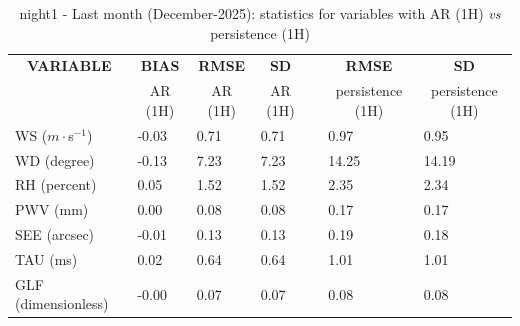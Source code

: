 \begin{table}[]
\begin{center}
\begin{tabular}{|l|l|l|l|l|l|l|}
\hline
\multicolumn{1}{|c|}{\cellcolor[HTML]{C0C0C0}\textbf{VARIABLE}} & \multicolumn{1}{c|}{\cellcolor[HTML]{C0C0C0}\textbf{BIAS}} & \multicolumn{1}{c|}{\cellcolor[HTML]{C0C0C0}\textbf{RMSE}} & \multicolumn{1}{c|}{\cellcolor[HTML]{C0C0C0}\textbf{SD}} & & \multicolumn{1}{c|}{\cellcolor[HTML]{C0C0C0}\textbf{RMSE}} & \multicolumn{1}{c|}{\cellcolor[HTML]{C0C0C0}\textbf{SD}}\\
\multicolumn{1}{|c|}{\cellcolor[HTML]{C0C0C0}} & \multicolumn{1}{c|}{\cellcolor[HTML]{C0C0C0}AR (1H)} & \multicolumn{1}{c|}{\cellcolor[HTML]{C0C0C0}AR (1H)} & \multicolumn{1}{c|}{\cellcolor[HTML]{C0C0C0}AR (1H)} & & \multicolumn{1}{c|}{\cellcolor[HTML]{C0C0C0}persistence (1H)} & \multicolumn{1}{c|}{\cellcolor[HTML]{C0C0C0}persistence (1H)}\\\hline
\cellcolor[HTML]{C0C0C0}WS ($m\cdot$s$^{-1}$) &     -0.03  &      0.71  &      0.71  & &      0.97  &      0.95\\
\cellcolor[HTML]{C0C0C0}WD (degree)           &     -0.13  &      7.23  &      7.23  & &     14.25  &     14.19\\
\cellcolor[HTML]{C0C0C0}RH (percent)          &      0.05  &      1.52  &      1.52  & &      2.35  &      2.34\\
\cellcolor[HTML]{C0C0C0}PWV (mm)              &      0.00 &      0.08 &      0.08 & &      0.17 &      0.17\\
\cellcolor[HTML]{C0C0C0}SEE (arcsec)          &     -0.01 &      0.13 &      0.13 & &      0.19 &      0.18\\
\cellcolor[HTML]{C0C0C0}TAU (ms)              &      0.02 &      0.64 &      0.64 & &      1.01 &      1.01\\
\cellcolor[HTML]{C0C0C0}GLF (dimensionless)   &     -0.00 &      0.07 &      0.07 & &      0.08 &      0.08\\
\hline
\end{tabular}
\caption{night1 - Last month (December-2025): statistics for variables with AR (1H) \textit{vs} persistence (1H)}\label{tab:night1:statAFT:LM}
\end{center}
\end{table}

